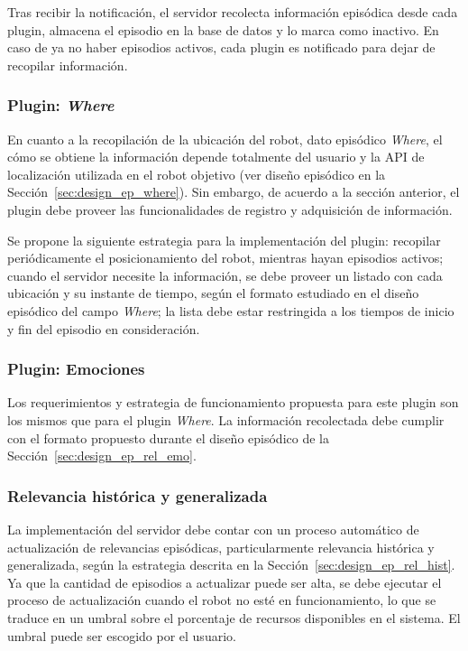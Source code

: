 Tras recibir la notificación, el servidor recolecta información episódica desde cada plugin, almacena el episodio en la base de datos y lo marca como inactivo. En caso de ya no haber episodios activos, cada plugin es notificado para dejar de recopilar información.


\subsubsection{Plugin: \textit{Where}}

En cuanto a la recopilación de la ubicación del robot, dato episódico \textit{Where}, el cómo se obtiene la información depende totalmente del usuario y la API de localización utilizada en el robot objetivo (ver diseño episódico en la Sección~\ref{sec:design_ep_where}). Sin embargo, de acuerdo a la sección anterior, el plugin debe proveer las funcionalidades de registro y adquisición de información.

Se propone la siguiente estrategia para la implementación del plugin: recopilar periódicamente el posicionamiento del robot, mientras hayan episodios activos; cuando el servidor necesite la información, se debe proveer un listado con cada ubicación y su instante de tiempo, según el formato estudiado en el diseño episódico del campo \textit{Where}; la lista debe estar restringida a los tiempos de inicio y fin del episodio en consideración.


\subsubsection{Plugin: Emociones}

Los requerimientos y estrategia de funcionamiento propuesta para este plugin son los mismos que para el plugin \textit{Where}. La información recolectada debe cumplir con el formato propuesto durante el diseño episódico de la Sección~\ref{sec:design_ep_rel_emo}.


\subsubsection{Relevancia histórica y generalizada}

La implementación del servidor debe contar con un proceso automático de actualización de relevancias episódicas, particularmente relevancia histórica y generalizada, según la estrategia descrita en la Sección~\ref{sec:design_ep_rel_hist}. Ya que la cantidad de episodios a actualizar puede ser alta, se debe ejecutar el proceso de actualización cuando el robot no esté en funcionamiento, lo que se traduce en un umbral sobre el porcentaje de recursos disponibles en el sistema. El umbral puede ser escogido por el usuario.


